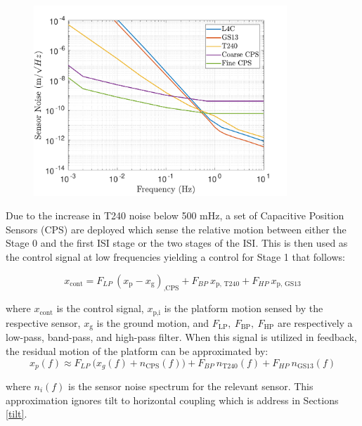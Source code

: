 \documentclass [12pt, proquest]{uwthesis}[2019]
\begin{document}
\begin{figure}[!h]
\begin{center}
\includegraphics[width=0.85\textwidth]{seismicSensNoise.pdf}
\caption[Sensor noise for the seismic isolation system]{}
\label{seisNoise}
\end{center}
\end{figure}

Due to the increase in T240 noise below 500 mHz, a set of Capacitive Position Sensors (CPS) are deployed which sense the relative motion between either the Stage 0 and the first ISI stage or the two stages of the ISI. This is then used as the control signal at low frequencies yielding a control for Stage 1 that follows:

\begin{equation}
x_\text{cont}=F_{LP}\ (x_\text{p}-x_\text{g})_\text{,CPS}+F_{BP}\ x_\text{p, T240}+F_{HP}\ x_\text{p, GS13}
\end{equation}

where $x_\text{cont}$ is the control signal, $x_\text{p,i}$ is the platform motion sensed by the respective sensor, $x_\text{g}$ is the ground motion, and $F_\text{LP},\  F_\text{BP},\ F_\text{HP}$ are respectively a low-pass, band-pass, and high-pass filter. When this signal is utilized in feedback, the residual motion of the platform can be approximated by:
\begin{equation}
x_p(f)\approx F_{LP}\ \big(x_g(f)+n_\text{CPS}(f)\big)+F_{BP}\ n_\text{T240}(f)+F_{HP}\ n_\text{GS13}(f)
\end{equation}

where $n_{i}(f)$ is the sensor noise spectrum for the relevant sensor. This approximation ignores tilt to horizontal coupling which is address in Sections \ref{tilt}.
\end{document}
